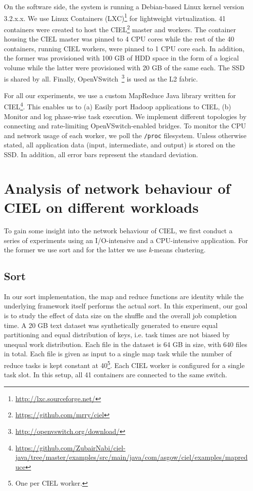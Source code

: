 \documentclass[a4paper,12pt,twoside,openright]{report}
\begin{document}
On the software side, the system is running a Debian-based Linux kernel version
3.2.x.x. We use Linux Containers
(LXC)\footnote{\url{http://lxc.sourceforge.net/}} for lightweight
virtualization. 41 containers were created to host the
CIEL\footnote{\url{https://github.com/mrry/ciel}} master and workers. The
container housing the CIEL master was pinned to 4 CPU cores while the rest of
the 40 containers, running CIEL workers, were pinned to 1 CPU core each. In
addition, the former was provisioned with 100 GB of HDD space in the form of a
logical volume while the latter were provisioned with 20 GB of the same each.
The SSD is shared by all. Finally,
OpenVSwitch~\cite{Pfaff:2009:ENI}\footnote{\url{http://openvswitch.org/download/}}
is used as the L2 fabric.

For all our experiments, we use a custom MapReduce Java library written for
CIEL\footnote{\url{https://github.com/ZubairNabi/ciel-java/tree/master/examples/src/main/java/com/asgow/ciel/examples/mapreduce}}.
This enables us to (a) Easily port Hadoop applications to CIEL, (b) Monitor and
log phase-wise task execution. We implement different topologies by connecting
and rate-limiting OpenVSwitch-enabled bridges. To monitor the CPU and network
usage of each worker, we poll the \texttt{/proc} filesystem. Unless otherwise
stated, all application data (input, intermediate, and output) is stored on the
SSD. In addition, all error bars represent the standard deviation.

\section{Analysis of network behaviour of CIEL on different workloads}
To gain some insight into the network behaviour of CIEL, we first conduct a
series of experiments using an I/O-intensive and a CPU-intensive application.
For the former we use sort and for the latter we use \emph{k}-means clustering.

\subsection{Sort}
In our sort implementation, the map and reduce functions are identity while the
underlying framework itself performs the actual sort. In this experiment, our
goal is to study the effect of data size on the shuffle and the overall job
completion time. A 20 GB text dataset was synthetically generated to ensure
equal partitioning and equal distribution of keys, i.e. task times are not
biased by unequal work distribution. Each file in the dataset is 64 GB in size,
with 640 files in total. Each file is given as input to a single map task while
the number of reduce tasks is kept constant at 40\footnote{One per CIEL
worker.}. Each CIEL worker is configured for a single task slot. In this setup,
all 41 containers are connected to the same switch.
\end{document}
